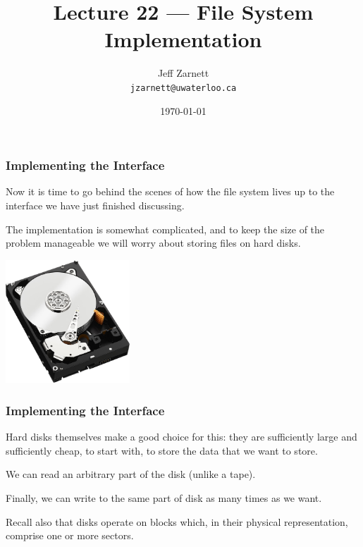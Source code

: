 

\title{Lecture 22 --- File System Implementation}

\author{Jeff Zarnett \\ \small \texttt{jzarnett@uwaterloo.ca}}
\date{\today}




\begin{frame}
  \titlepage

 \end{frame}



\begin{frame}
\frametitle{Implementing the Interface}

Now it is time to go behind the scenes of how the file system lives up to the interface we have just finished discussing. 

The implementation is somewhat complicated, and to keep the size of the problem manageable we will worry about storing files on hard disks.

\begin{center}
	\includegraphics[width=0.35\textwidth]{images/hdd.jpg}
\end{center}

 \end{frame}



\begin{frame}
\frametitle{Implementing the Interface}

 Hard disks themselves make a good choice for this: they are sufficiently large and sufficiently cheap, to start with, to store the data that we want to store. 
 
 We can read an arbitrary part of the disk (unlike a tape). 
 
Finally, we can write to the same part of disk as many times as we want. 
 
Recall also that disks operate on blocks which, in their physical representation, comprise one or more sectors.


\end{frame}

